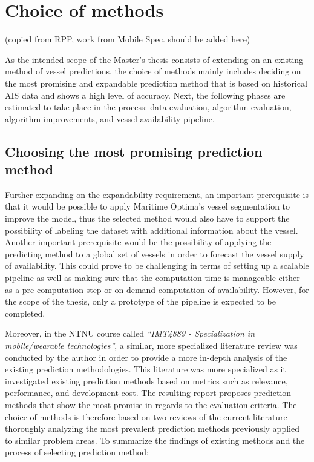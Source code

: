 \chapter{Choice of methods}


(copied from RPP, work from Mobile Spec. should be added here)

As the intended scope of the Master’s thesis consists of extending on an existing method of vessel predictions, the choice of methods mainly includes deciding on the most promising and expandable prediction method that is based on historical AIS data and shows a high level of accuracy. Next, the following phases are estimated to take place in the process: data evaluation, algorithm evaluation, algorithm improvements, and vessel availability pipeline.

\section{Choosing the most promising prediction method}

Further expanding on the expandability requirement, an important prerequisite is that it would be possible to apply Maritime Optima’s vessel segmentation to improve the model, thus the selected method would also have to support the possibility of labeling the dataset with additional information about the vessel. Another important prerequisite would be the possibility of applying the predicting method to a global set of vessels in order to forecast the vessel supply of availability. This could prove to be challenging in terms of setting up a scalable pipeline as well as making sure that the computation time is manageable either as a pre-computation step or on-demand computation of availability. However, for the scope of the thesis, only a prototype of the pipeline is expected to be completed.

Moreover, in the NTNU course called \textit{“IMT4889 - Specialization in mobile/wearable technologies”}, a similar, more specialized literature review was conducted by the author in order to provide a more in-depth analysis of the existing prediction methodologies. This literature was more specialized as it investigated existing prediction methods based on metrics such as relevance, performance, and development cost. The resulting report proposes prediction methods that show the most promise in regards to the evaluation criteria. The choice of methods is therefore based on two reviews of the current literature thoroughly analyzing the most prevalent prediction methods previously applied to similar problem areas. To summarize the findings of existing methods and the process of selecting prediction method:

